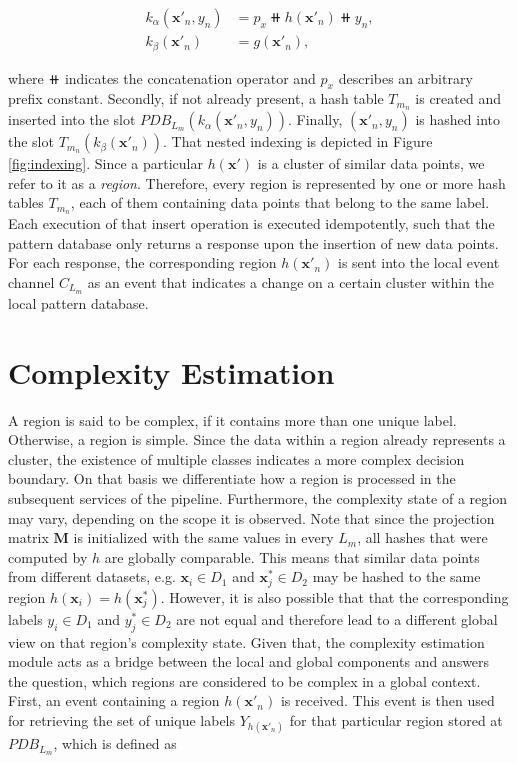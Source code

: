 \begin{align*}
    k_\alpha(\bm{x}'_n, y_n) &= p_x \doubleplus h(\bm{x}'_n) \doubleplus y_n,\\
    k_\beta(\bm{x}'_n) &= g(\bm{x}'_n),
\end{align*}

where $\doubleplus$ indicates the concatenation operator and $p_x$ describes an arbitrary prefix constant. Secondly, if not already present, a hash table $T_{m_n}$ is created and inserted into the slot $PDB_{L_m}(k_\alpha(\bm{x}'_n, y_n))$. Finally, $(\bm{x}'_n, y_n)$ is hashed into the slot $T_{m_n}(k_\beta(\bm{x}'_n))$. That nested indexing is depicted in Figure \ref{fig:indexing}. Since a particular $h(\bm{x}')$ is a cluster of similar data points, we refer to it as a \textit{region}. Therefore, every region is represented by one or more hash tables $T_{m_n}$, each of them containing data points that belong to the same label. Each execution of that insert operation is executed idempotently, such that the pattern database only returns a response upon the insertion of new data points. For each response, the corresponding region $h(\bm{x}'_n)$ is sent into the local event channel $C_{L_m}$ as an event that indicates a change on a certain cluster within the local pattern database.

\section{Complexity Estimation}

A region is said to be complex, if it contains more than one unique label. Otherwise, a region is simple. Since the data within a region already represents a cluster, the existence of multiple classes indicates a more complex decision boundary. On that basis we differentiate how a region is processed in the subsequent services of the pipeline. Furthermore, the complexity state of a region may vary, depending on the scope it is observed. Note that since the projection matrix $\bm{M}$ is initialized with the same values in every $L_m$, all hashes that were computed by $h$ are globally comparable. This means that similar data points from different datasets, e.g. $\bm{x}_i \in D_1$ and $\bm{x}_j^* \in D_2$ may be hashed to the same region $h(\bm{x}_i) = h(\bm{x}^*_j)$. However, it is also possible that that the corresponding labels $y_i \in D_1$ and $y^*_j \in D_2$ are not equal and therefore lead to a different global view on that region's complexity state. Given that, the complexity estimation module acts as a bridge between the local and global components and answers the question, which regions are considered to be complex in a global context. First, an event containing a region $h(\bm{x}'_n)$ is received. This event is then used for retrieving the set of unique labels $Y_{h(\bm{x}'_n)}$ for that particular region stored at $PDB_{L_m}$, which is defined as

